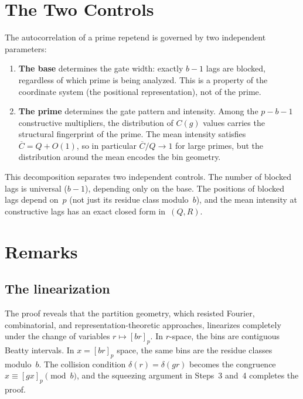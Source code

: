 \documentclass[12pt]{amsart}
\theoremstyle{definition}
\theoremstyle{remark}
\begin{document}
\section{The Two Controls}

The autocorrelation of a prime repetend is governed by two
independent parameters:

\begin{enumerate}
\item \textbf{The base} determines the gate width: exactly
$b - 1$ lags are blocked, regardless of which prime is being
analyzed. This is a property of the coordinate system (the
positional representation), not of the prime.

\item \textbf{The prime} determines the gate pattern and
intensity. Among the $p - b - 1$ constructive multipliers,
the distribution of $C(g)$ values carries the structural
fingerprint of the prime. The mean intensity satisfies
$\overline{C} = Q + O(1)$, so in particular $\overline{C}/Q \to 1$
for large primes, but the
distribution around the mean encodes the bin geometry.
\end{enumerate}

This decomposition separates two independent controls.
The number of blocked lags is universal ($b - 1$), depending
only on the base. The positions of blocked lags depend on~$p$
(not just its residue class modulo~$b$), and the mean
intensity at constructive lags has an exact closed form
in~$(Q, R)$.

\section{Remarks}

\subsection*{The linearization}

The proof reveals that the partition geometry, which resisted
Fourier, combinatorial, and representation-theoretic approaches,
linearizes completely under the change of variables $r \mapsto
[br]_p$. In $r$-space, the bins are contiguous Beatty intervals.
In $x = [br]_p$ space, the same bins are the residue classes
modulo~$b$. The collision condition $\delta(r) = \delta(gr)$
becomes the congruence $x \equiv [gx]_p \pmod{b}$, and the
squeezing argument in Steps~3 and~4 completes the proof.
\end{document}
